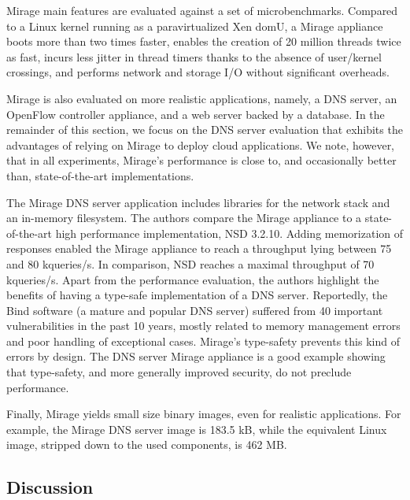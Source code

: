 Mirage main features are evaluated against a set of microbenchmarks.
Compared to a Linux kernel running as a paravirtualized Xen domU, a Mirage appliance boots more than two times faster, enables the creation of 20 million threads twice as fast, incurs less jitter in thread timers thanks to the absence of user/kernel crossings, and performs network and storage I/O without significant overheads.

Mirage is also evaluated on more realistic applications, namely, a DNS server, an OpenFlow controller appliance, and a web server backed by a database.
In the remainder of this section, we focus on the DNS server evaluation that exhibits the advantages of relying on Mirage to deploy cloud applications.
We note, however, that in all experiments, Mirage's performance is close to, and occasionally better than, state-of-the-art implementations.

The Mirage DNS server application includes libraries for the network stack and an in-memory filesystem.
The authors compare the Mirage appliance to a state-of-the-art high performance implementation, NSD 3.2.10.
Adding memorization of responses enabled the Mirage appliance to reach a throughput lying between 75 and 80 kqueries/s.
In comparison, NSD reaches a maximal throughput of 70 kqueries/s.
Apart from the performance evaluation, the authors highlight the benefits of having a type-safe implementation of a DNS server.
Reportedly, the Bind software (a mature and popular DNS server) suffered from 40 important vulnerabilities in the past 10 years, mostly related to memory management errors and poor handling of exceptional cases.
Mirage's type-safety prevents this kind of errors by design.
The DNS server Mirage appliance is a good example showing that type-safety, and more generally improved security, do not preclude performance. 

Finally, Mirage yields small size binary images, even for realistic applications.
For example, the Mirage DNS server image is 183.5 kB, while the equivalent Linux image, stripped down to the used components, is 462 MB.


\subsection{Discussion}


